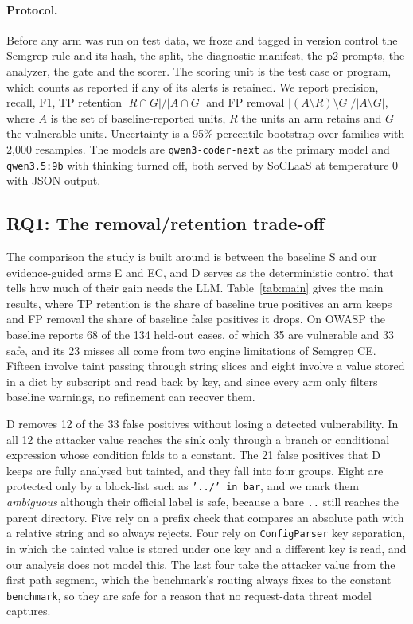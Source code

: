 \begin{table}[t]
\caption{Evaluation subjects.}
\label{tab:subjects}
\small
\end{table}

\paragraph{Protocol.}
Before any arm was run on test data, we froze and tagged in version control the Semgrep rule and its hash, the split, the diagnostic manifest, the p2 prompts, the analyzer, the gate and the scorer. The scoring unit is the test case or program, which counts as reported if any of its alerts is retained. We report precision, recall, F1, TP retention $|R\cap G|/|A\cap G|$ and FP removal $|(A\setminus R)\setminus G|/|A\setminus G|$, where $A$ is the set of baseline-reported units, $R$ the units an arm retains and $G$ the vulnerable units. Uncertainty is a 95\% percentile bootstrap over families with 2{,}000 resamples. The models are \texttt{qwen3-coder-next} as the primary model and \texttt{qwen3.5:9b} with thinking turned off, both served by SoCLaaS at temperature 0 with JSON output.

\subsection{RQ1: The removal/retention trade-off}
The comparison the study is built around is between the baseline S and our evidence-guided arms E and EC, and D serves as the deterministic control that tells how much of their gain needs the LLM. Table~\ref{tab:main} gives the main results, where TP retention is the share of baseline true positives an arm keeps and FP removal the share of baseline false positives it drops. On OWASP the baseline reports 68 of the 134 held-out cases, of which 35 are vulnerable and 33 safe, and its 23 misses all come from two engine limitations of Semgrep CE. Fifteen involve taint passing through string slices and eight involve a value stored in a dict by subscript and read back by key, and since every arm only filters baseline warnings, no refinement can recover them.

D removes 12 of the 33 false positives without losing a detected vulnerability. In all 12 the attacker value reaches the sink only through a branch or conditional expression whose condition folds to a constant. The 21 false positives that D keeps are fully analysed but tainted, and they fall into four groups. Eight are protected only by a block-list such as \texttt{'../' in bar}, and we mark them \emph{ambiguous} although their official label is safe, because a bare \texttt{..} still reaches the parent directory. Five rely on a prefix check that compares an absolute path with a relative string and so always rejects. Four rely on \texttt{ConfigParser} key separation, in which the tainted value is stored under one key and a different key is read, and our analysis does not model this. The last four take the attacker value from the first path segment, which the benchmark's routing always fixes to the constant \texttt{benchmark}, so they are safe for a reason that no request-data threat model captures.

